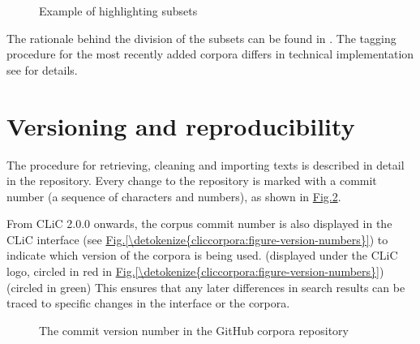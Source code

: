 \documentclass[letterpaper,10pt,english]{sphinxmanual}
\begin{document}
\begin{figure}[htbp]
\centering
\capstart

\noindent{}
\caption{Example of highlighting subsets}\label{\detokenize{cliccorpora:id8}}\label{\detokenize{cliccorpora:figure-corpora-highlight-subsets}}\end{figure}

\sphinxAtStartPar
The rationale behind the division of the subsets can be found in
. The tagging procedure for the most recently
added corpora differs in technical implementation \textendash{} see
 for details.


\section{Versioning and reproducibility}
\label{\detokenize{cliccorpora:versioning-and-reproducibility}}
\sphinxAtStartPar
The procedure for retrieving, cleaning and importing texts is described in detail in the  repository. Every
change to the repository is marked with a commit number (a sequence of
characters and numbers), as shown in
\hyperref[\detokenize{cliccorpora:figure-version-numbers-github}]{Fig.\@ \ref{\detokenize{cliccorpora:figure-version-numbers-github}}}.

\sphinxAtStartPar
From CLiC 2.0.0 onwards, the corpus commit number is also displayed in
the CLiC interface (see \hyperref[\detokenize{cliccorpora:figure-version-numbers}]{Fig.\@ \ref{\detokenize{cliccorpora:figure-version-numbers}}}) to indicate
which version of the corpora is being used.  (displayed under the CLiC logo,
circled in red in \hyperref[\detokenize{cliccorpora:figure-version-numbers}]{Fig.\@ \ref{\detokenize{cliccorpora:figure-version-numbers}}})  (circled in green)  This ensures that
any later differences in search results can be traced to specific
changes in the interface or the corpora.

\begin{figure}[htbp]
\centering
\capstart

\noindent{}
\caption{The commit version number in the GitHub corpora repository}\label{\detokenize{cliccorpora:id9}}\label{\detokenize{cliccorpora:figure-version-numbers-github}}\end{figure}
\end{document}
